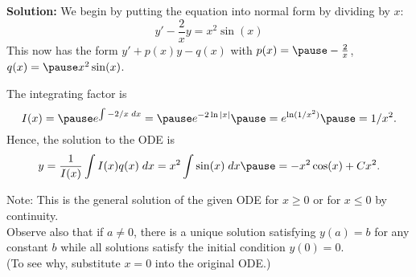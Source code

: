 \begin{frame}


\begin{example}[ Solve $xy'-2y=x^3\sin(x)$]
\textbf{Solution:} \pause 
We begin by putting the equation into normal form by
dividing by $x$:
$$y'-\frac{2}{x}y=x^2\sin(x)$$
\pause 
This now has the form $ y'+p(x)y-q(x) $ with $p(x)= \pause -\frac{2}{x}$, $q(x)= \pause x^2\sin(x)$. 
 
The integrating factor is $$I(x)=\pause e^{\int -2/x\; dx}=\pause e^{-2\ln|x|}\pause = e^{\ln(1/x^2)} \pause =1/x^2.$$
\pause 
Hence, the solution to the ODE is
$$y=\frac{1}{I(x)}\int I(x)q(x)\;dx = x^2\int \sin(x)\;dx \pause =-x^2\cos(x)+Cx^2. $$
\pause 
{\scriptsize{Note: This is the general solution of the given ODE for $x\ge0$ or for $x\le0$ by continuity.\\
Observe also that if $a\ne0$, there is a unique
solution satisfying $y(a)=b$ for any constant $b$ while all
solutions satisfy the initial condition $y(0)=0$.\\
(To see why, substitute $ x=0 $ into the original ODE.)


}}

\end{example}
 
\end{frame}

